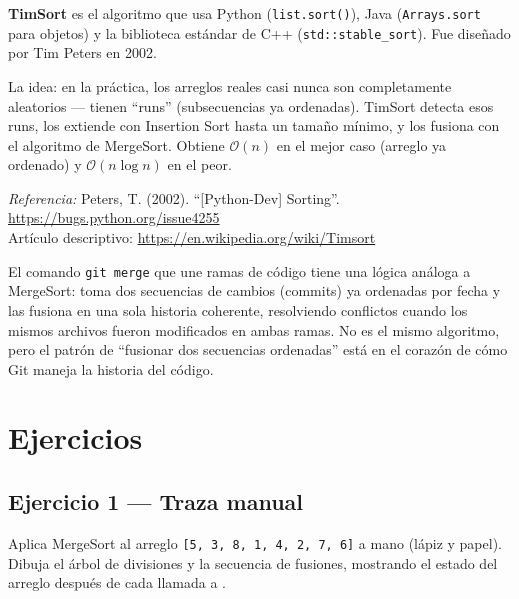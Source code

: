 \documentclass[12pt, oneside]{article}
\begin{document}
\begin{tecnico}
  \textbf{TimSort} es el algoritmo que usa Python (\texttt{list.sort()}),
  Java (\texttt{Arrays.sort} para objetos) y la biblioteca estándar de C++
  (\texttt{std::stable\_sort}). Fue diseñado por Tim Peters en 2002.
  \par\smallskip
  La idea: en la práctica, los arreglos reales casi nunca son completamente
  aleatorios — tienen ``runs'' (subsecuencias ya ordenadas). TimSort detecta
  esos runs, los extiende con Insertion Sort hasta un tamaño mínimo, y los
  fusiona con el algoritmo de MergeSort. Obtiene $\mathcal{O}(n)$ en el mejor
  caso (arreglo ya ordenado) y $\mathcal{O}(n \log n)$ en el peor.
  \par\smallskip
  \textit{Referencia:} Peters, T. (2002). ``[Python-Dev] Sorting''.
  \url{https://bugs.python.org/issue4255}\\
  Artículo descriptivo: \url{https://en.wikipedia.org/wiki/Timsort}
\end{tecnico}

\begin{ejemplo}
  El comando \texttt{git merge} que une ramas de código tiene una lógica análoga
  a MergeSort: toma dos secuencias de cambios (commits) ya ordenadas por fecha
  y las fusiona en una sola historia coherente, resolviendo conflictos cuando
  los mismos archivos fueron modificados en ambas ramas. No es el mismo algoritmo,
  pero el patrón de ``fusionar dos secuencias ordenadas'' está en el corazón de
  cómo Git maneja la historia del código.
\end{ejemplo}

\section{Ejercicios}

\subsection*{Ejercicio 1 — Traza manual}

Aplica MergeSort al arreglo \texttt{[5, 3, 8, 1, 4, 2, 7, 6]} a mano (lápiz
y papel). Dibuja el árbol de divisiones y la secuencia de fusiones, mostrando
el estado del arreglo después de cada llamada a .
\end{document}
